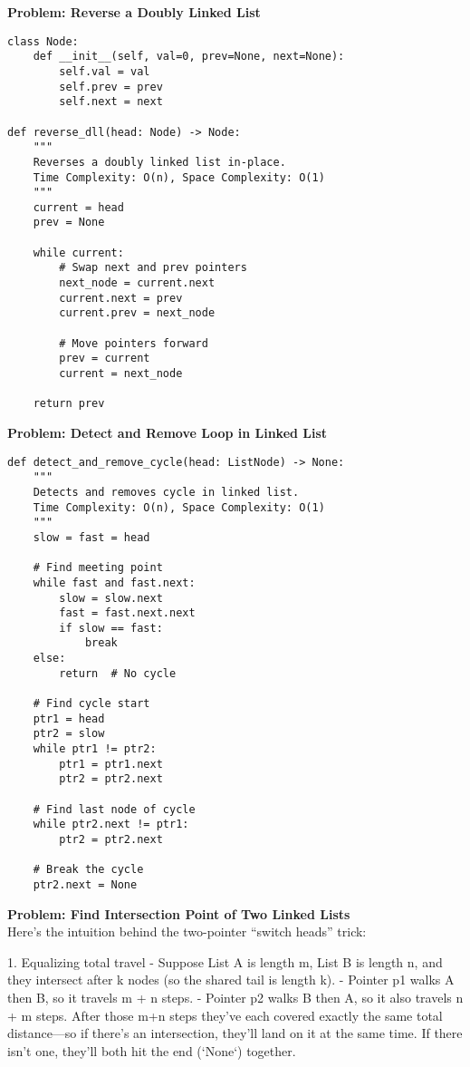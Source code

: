 \noindent\textbf{Problem: Reverse a Doubly Linked List}
\begin{verbatim}
class Node:
    def __init__(self, val=0, prev=None, next=None):
        self.val = val
        self.prev = prev
        self.next = next

def reverse_dll(head: Node) -> Node:
    """
    Reverses a doubly linked list in-place.
    Time Complexity: O(n), Space Complexity: O(1)
    """
    current = head
    prev = None
    
    while current:
        # Swap next and prev pointers
        next_node = current.next
        current.next = prev
        current.prev = next_node
        
        # Move pointers forward
        prev = current
        current = next_node
    
    return prev
\end{verbatim}
\noindent\textbf{Problem: Detect and Remove Loop in Linked List}
\begin{verbatim}
def detect_and_remove_cycle(head: ListNode) -> None:
    """
    Detects and removes cycle in linked list.
    Time Complexity: O(n), Space Complexity: O(1)
    """
    slow = fast = head
    
    # Find meeting point
    while fast and fast.next:
        slow = slow.next
        fast = fast.next.next
        if slow == fast:
            break
    else:
        return  # No cycle
    
    # Find cycle start
    ptr1 = head
    ptr2 = slow
    while ptr1 != ptr2:
        ptr1 = ptr1.next
        ptr2 = ptr2.next
    
    # Find last node of cycle
    while ptr2.next != ptr1:
        ptr2 = ptr2.next
    
    # Break the cycle
    ptr2.next = None
\end{verbatim}

\noindent\textbf{Problem: Find Intersection Point of Two Linked Lists}\\
Here’s the intuition behind the two-pointer “switch heads” trick:

1. Equalizing total travel  
   - Suppose List A is length m, List B is length n, and they intersect after k nodes (so the shared tail is length k).  
   - Pointer p1 walks A then B, so it travels m + n steps.  
   - Pointer p2 walks B then A, so it also travels n + m steps.  
   After those m+n steps they’ve each covered exactly the same total distance—so if there’s an intersection, they’ll land on it at the same time. If there isn’t one, they’ll both hit the end (`None`) together.

